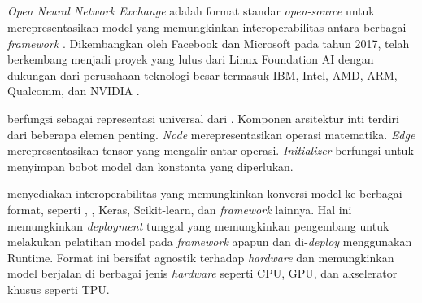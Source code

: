 \subsection{\onnx}
\label{subsec:onnx}

\emph{Open Neural Network Exchange} \onnx{} adalah format standar \emph{open-source} untuk merepresentasikan model \ml{} yang memungkinkan interoperabilitas antara berbagai \emph{framework} \dl. Dikembangkan oleh Facebook dan Microsoft pada tahun 2017, \onnx{} telah berkembang menjadi proyek yang lulus dari Linux Foundation AI dengan dukungan dari perusahaan teknologi besar termasuk IBM, Intel, AMD, ARM, Qualcomm, dan NVIDIA \parencite{onnxgithub2019}.

\onnx{} berfungsi sebagai representasi universal dari \nn. Komponen arsitektur inti \onnx{} terdiri dari beberapa elemen penting. \emph{Node} merepresentasikan operasi matematika. \emph{Edge} merepresentasikan tensor yang mengalir antar operasi. \emph{Initializer} berfungsi untuk menyimpan bobot model dan konstanta yang diperlukan.



\onnx{} menyediakan interoperabilitas yang memungkinkan konversi model ke berbagai format, seperti \pytorch, \tensorflow, Keras, Scikit-learn, dan \emph{framework} lainnya. Hal ini memungkinkan \emph{deployment} tunggal yang memungkinkan pengembang untuk melakukan pelatihan model pada \emph{framework} apapun dan di-\emph{deploy} menggunakan \onnx Runtime. Format ini bersifat agnostik terhadap \emph{hardware} dan memungkinkan model berjalan di berbagai jenis \emph{hardware} seperti CPU, GPU, dan akselerator khusus seperti TPU.

